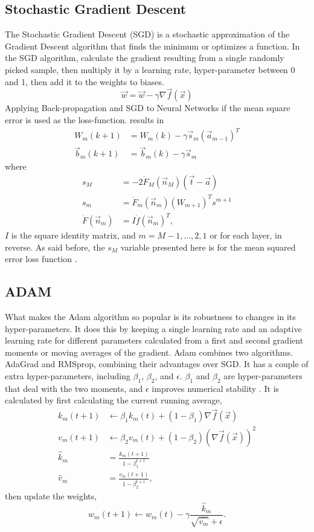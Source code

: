 \subsection{Stochastic Gradient Descent}

The Stochastic Gradient Descent (SGD) is a stochastic approximation of the Gradient Descent algorithm that finds the minimum or optimizes a function. In the SGD algorithm, calculate the gradient resulting from a single randomly picked sample, then multiply it by a learning rate, hyper-parameter between 0 and 1, then add it to the weights to biases. $$\vec{w}=\vec{w}-\gamma\nabla \vec{f}(\vec{x})$$ Applying Back-propagation and SGD to Neural Networks if the mean square error is used as the loss-function. results in 
\begin{align*}
W_{m}(k+1)&=W_{m}(k)-\gamma \vec{s}_m (\vec{a}_{m-1})^T\\
\vec{b}_m(k+1)&=\vec{b}_{m}(k)-\gamma \vec{s}_m
\end{align*} where
\begin{align*}
s_{M}&=-2\dot{F}_M(\vec{n}_M)(\vec{t}-\vec{a})\\
s_m&=\dot{F}_m(\vec{n}_m)(W_{m+1})^T s^{m+1}\\
\dot{F}(\vec{n}_m)&=I\dot{f}(\vec{n}_m)^T,
\end{align*} $I$ is the square identity matrix, and $m=M-1,\dots, 2, 1$ or for each layer, in reverse. As said before, the $s_M$ variable presented here is for the mean squared error loss function \cite{hagan_demuth_beale_jesus_orlando_de_2014}.

\subsection{ADAM}

What makes the Adam algorithm so popular is its robustness to changes in its hyper-parameters. It does this by keeping a single learning rate and an adaptive learning rate for different parameters calculated from a first and second gradient moments or moving averages of the gradient. Adam combines two algorithms. AdaGrad and RMSprop, combining their advantages over SGD. It has a couple of extra hyper-parameters, including $\beta_1$, $\beta_2$, and $\epsilon$. $\beta_1$ and $\beta_2$ are hyper-parameters that deal with the two moments, and $\epsilon$ improves numerical stability \cite{kingma_ba_2017}. It is calculated by first calculating the current running average, \begin{align*}
	k_m(t+1)&\leftarrow \beta_1 k_m(t)+(1-\beta_1)\nabla \vec{f}(\vec{x})\\
	v_m(t+1)&\leftarrow \beta_2 v_m(t)+(1-\beta_2)(\nabla \vec{f}(\vec{x}))^2\\
	\hat{k}_m&=\frac{k_m(t+1)}{1-\beta_1^{t+1}}\\
	\hat{v}_m&=\frac{v_m(t+1)}{1-\beta_2^{t+1}},
\end{align*} then update the weights, 
$$w_m(t+1)\leftarrow w_m(t)-\gamma\frac{\hat{k}_m}{\sqrt{\hat{v_m}}+\epsilon}.$$

